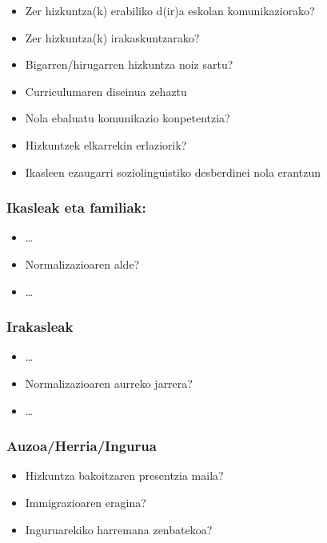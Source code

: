 \documentclass[
]{book}
\providecommand{\tightlist}{%
  \setlength{\itemsep}{0pt}\setlength{\parskip}{0pt}}
\begin{document}
\begin{itemize}
\tightlist
\item
  Zer hizkuntza(k) erabiliko d(ir)a eskolan komunikaziorako?
\item
  Zer hizkuntza(k) irakaskuntzarako?
\item
  Bigarren/hirugarren hizkuntza noiz sartu?
\item
  Curriculumaren diseinua zehaztu
\item
  Nola ebaluatu komunikazio konpetentzia?
\item
  Hizkuntzek elkarrekin erlaziorik?
\item
  Ikasleen ezaugarri soziolinguistiko desberdinei nola erantzun
\end{itemize}

\hypertarget{ikasleak-eta-familiak}{%
\subsubsection*{Ikasleak eta familiak:}\label{ikasleak-eta-familiak}}

\begin{itemize}
\tightlist
\item
  \ldots{}
\item
  Normalizazioaren alde?
\item
  \ldots{}
\end{itemize}

\hypertarget{irakasleak}{%
\subsubsection*{Irakasleak}\label{irakasleak}}

\begin{itemize}
\tightlist
\item
  \ldots{}
\item
  Normalizazioaren aurreko jarrera?
\item
  \ldots{}
\end{itemize}

\hypertarget{auzoaherriaingurua}{%
\subsubsection*{Auzoa/Herria/Ingurua}\label{auzoaherriaingurua}}

\begin{itemize}
\tightlist
\item
  Hizkuntza bakoitzaren presentzia maila?
\item
  Immigrazioaren eragina?
\item
  Inguruarekiko harremana zenbatekoa?
\end{itemize}
\end{document}

